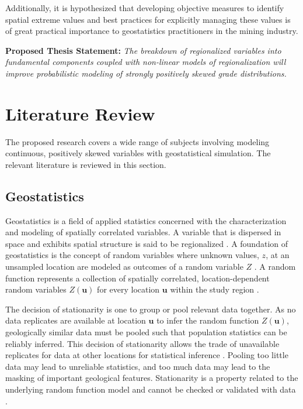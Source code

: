 Additionally, it is hypothesized that developing objective measures to identify spatial extreme values and best practices for explicitly managing these values is of great practical importance to geostatistics practitioners in the mining industry.


\begin{tcolorbox}
    \textbf{Proposed Thesis Statement:} \textit{The breakdown of regionalized variables into fundamental components coupled with non-linear models of regionalization will improve probabilistic modeling of strongly positively skewed grade distributions.}
\end{tcolorbox}



\FloatBarrier
\section{Literature Review}
\label{sec:01litreview}

The proposed research covers a wide range of subjects involving modeling continuous, positively skewed variables with geostatistical simulation. The relevant literature is reviewed in this section.

\FloatBarrier
\subsection{Geostatistics}
\label{subsec:01geostats}

Geostatistics is a field of applied statistics concerned with the characterization and modeling of spatially correlated variables. A variable that is dispersed in space and exhibits spatial structure is said to be regionalized \citep{matheron2019matheron}. A foundation of geostatistics is the concept of random variables where unknown values, $z$, at an unsampled location are modeled as outcomes of a random variable $Z$ \citep{deutsch1992geostatistical}. A random function represents a collection of spatially correlated, location-dependent random variables $Z(\mathbf{u})$ for every location $\mathbf{u}$ within the study region \citep{goovaerts1997geostatistics}.

The decision of stationarity is one to group or pool relevant data together. As no data replicates are available at location $\mathbf{u}$ to infer the random function $Z(\mathbf{u})$, geologically similar data must be pooled such that population statistics can be reliably inferred. This decision of stationarity allows the trade of unavailable replicates for data at other locations for statistical inference \citep{deutsch1992geostatistical}. Pooling too little data may lead to unreliable statistics, and too much data may lead to the masking of important geological features. Stationarity is a property related to the underlying random function model and cannot be checked or validated with data \citep{goovaerts1997geostatistics}.

